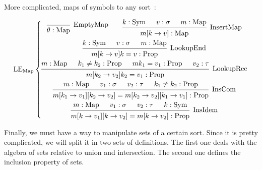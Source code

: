 \documentclass[]{article}
\newcommand{\1}{\mathbbm{1}}
\newcommand{\0}{\mathbbm{0}}
\newcommand{\Prop}{\text{Prop}}
\newcommand{\Sym}{\text{Sym}}
\newcommand{\Map}{\text{Map}}
\newcommand{\proof}[1]{{\scantokens{\begin{prooftree}#1\end{prooftree}}}}
\begin{document}
More complicated, maps of symbols to any sort~:

\[\text{LE}_\text{Map}\left\{
    \begin{gathered}
        \proof{
            \infer0[EmptyMap]{\theta:\Map}
        }
        \qquad\proof{
            \hypo{k : \Sym}
            \hypo{v : \sigma}
            \hypo{m : \Map}
            \infer3[InsertMap]{m[k\rightarrow v] : \Map}
        }\\
        \proof{
            \hypo{k : \Sym}
            \hypo{v : \sigma}
            \hypo{m : \Map}
            \infer3[LookupEnd]{m[k\rightarrow v]k = v:\Prop}
        }\\
        \proof{
            \hypo{m : \Map}
            \hypo{k_1\neq k_2 : \Prop}
            \hypo{m k_1 = v_1 : \Prop}
            \hypo{v_2 : \tau}
            \infer4[LookupRec]{m[k_2\rightarrow v_2]k_2 = v_1 : \Prop}
        }\\
        \proof{
            \hypo{m : \Map}
            \hypo{v_1 : \sigma}
            \hypo{v_2 : \tau}
            \hypo{k_1\neq k_2 : \Prop}
            \infer4[InsCom]{m[k_1\rightarrow v_1][k_2\rightarrow v_2] =
                    m[k_2\rightarrow v_2][k_1\rightarrow v_1] : \Prop}
        }\\
        \proof{
            \hypo{m : \Map}
            \hypo{v_1 : \sigma}
            \hypo{v_2 : \tau}
            \hypo{k : \Sym}
            \infer4[InsIdem]{m[k\rightarrow v_1][k\rightarrow v_2] =
                    m[k\rightarrow v_2] : \Prop}
        }
    \end{gathered}
\right.\]

Finally, we must have a way to manipulate sets of a certain sort. Since it is pretty
complicated, we will split it in two sets of definitions. The first one deals with
the algebra of sets relative to union and intersection. The second one defines the
inclusion property of sets.
\end{document}
